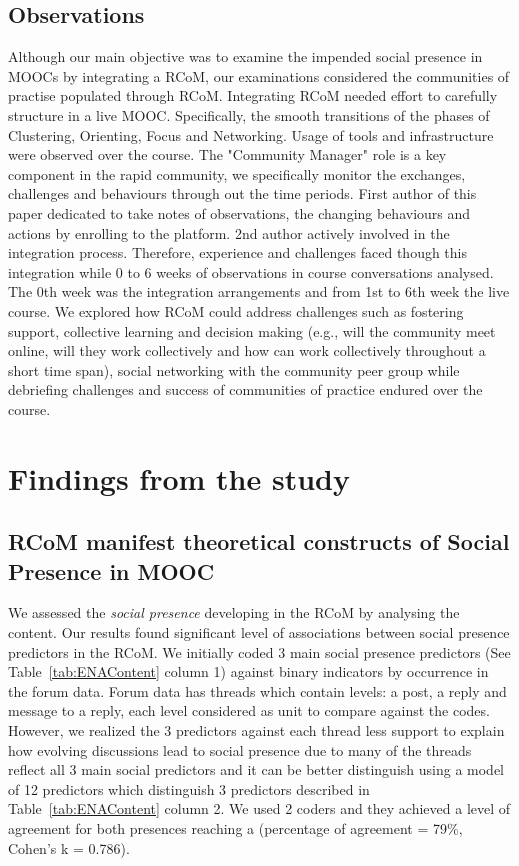 \documentclass[format=acmsmall, review=false, screen=true]{acmart}
\begin{document}
\subsection{Observations}
Although our main objective was to examine the impended social presence in MOOCs by integrating a RCoM, our examinations considered the communities of practise populated through RCoM. Integrating RCoM needed effort to carefully structure in a live MOOC. Specifically, the smooth transitions of the phases of Clustering, Orienting, Focus and Networking. Usage of tools and infrastructure were observed over the course. The "Community Manager" role is a key component in the rapid community, we specifically monitor the exchanges, challenges and behaviours through out the time periods. First author of this paper dedicated to take notes of observations, the changing behaviours and actions by enrolling to the platform. 2nd author actively involved in the integration process. Therefore, experience and challenges faced though this integration while 0 to 6 weeks of observations in course conversations analysed. The 0th week was the integration arrangements and from 1st to 6th week the live course. We explored how RCoM could address challenges such as fostering support, collective learning and decision making (e.g., will the community meet online, will they work collectively and how can work collectively throughout a short time span), social networking with the community peer group while debriefing challenges and success of communities of practice endured over the course. 

\section{Findings from the study}

\subsection{RCoM manifest theoretical constructs of Social Presence in MOOC}
We assessed the \textit{social presence} developing in the RCoM by analysing the content. Our results found significant level of associations between social presence predictors in the RCoM. We initially coded 3 main social presence predictors (See Table~\ref{tab:ENAContent} column 1) against binary indicators by occurrence in the forum data. Forum data has threads which contain levels: a post, a reply and message to a reply, each level considered as unit to compare against the codes. However, we realized the 3 predictors against each thread less support to explain how evolving discussions lead to social presence due to many of the threads reflect all 3 main social predictors and it can be better distinguish using a model of 12 predictors which distinguish 3 predictors described in Table~\ref{tab:ENAContent} column 2. We used 2 coders and they achieved a level of agreement for both presences reaching a (percentage of agreement = 79\%, Cohen's k = 0.786). 
\end{document}
